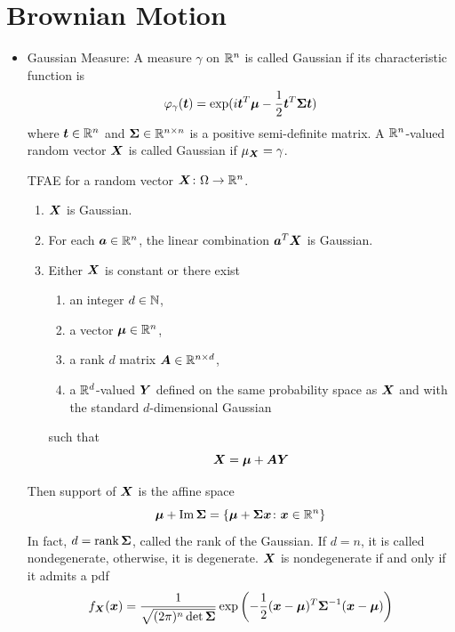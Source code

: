 \documentclass[a4paper,12pt]{article}
\begin{document}
\section{Brownian Motion}
\begin{itemize}
  \item Gaussian Measure: A measure $\gamma$ on $\mathbb{R}^n$ is called Gaussian if its characteristic function is
  \begin{equation*}
    \varphi_{\gamma}(\boldsymbol{t}) = \exp(i\boldsymbol{t}^T\boldsymbol{\mu}-\frac{1}{2}\boldsymbol{t}^T\boldsymbol{\Sigma}\boldsymbol{t})
  \end{equation*}
  where $\boldsymbol{t} \in \mathbb{R}^n$ and $\boldsymbol{\Sigma} \in \mathbb{R}^{n\times n}$ is a positive semi-definite matrix. A $\mathbb{R}^n$-valued random vector $\boldsymbol{X}$ is called Gaussian if $\mu_{\boldsymbol{X}} = \gamma$.

  \begin{thm}
    TFAE for a random vector $\boldsymbol{X} \colon \Omega \rightarrow \mathbb{R}^n$.
    \begin{enumerate}[label=(\arabic*)]
      \item $\boldsymbol{X}$ is Gaussian.
      \item For each $\boldsymbol{a} \in \mathbb{R}^n$, the linear combination $\boldsymbol{a}^T\boldsymbol{X}$ is Gaussian.
      \item Either $\boldsymbol{X}$ is constant or there exist
      \begin{enumerate}[label=(\roman*)]
        \item an integer $d \in \mathbb{N}$,
        \item a vector $\boldsymbol{\mu} \in \mathbb{R}^n$,
        \item a rank $d$ matrix $\boldsymbol{A} \in \mathbb{R}^{n \times d}$,
        \item a $\mathbb{R}^d$-valued $\boldsymbol{Y}$ defined on the same probability space as $\boldsymbol{X}$ and with the standard $d$-dimensional Gaussian
      \end{enumerate}
      such that
      \begin{equation*}
        \boldsymbol{X} = \boldsymbol{\mu} + \boldsymbol{A}\boldsymbol{Y}
      \end{equation*}
    \end{enumerate}
  \end{thm}
  \begin{rmk}
    Then support of $\boldsymbol{X}$ is the affine space
    \begin{equation*}
      \boldsymbol{\mu} + \operatorname{Im} \boldsymbol{\Sigma} = \left\{\boldsymbol{\mu} + \boldsymbol{\Sigma}\boldsymbol{x} \colon \boldsymbol{x} \in \mathbb{R}^n\right\}
    \end{equation*}
    In fact, $d = \operatorname{rank} \boldsymbol{\Sigma}$, called the rank of the Gaussian. If $d = n$, it is called nondegenerate, otherwise, it is degenerate. $\boldsymbol{X}$ is nondegenerate if and only if it admits a pdf
    \begin{equation*}
      f_{\boldsymbol{X}}(\boldsymbol{x})=\frac{1}{\sqrt{(2 \pi)^n \operatorname{det} \boldsymbol{\Sigma}}} \exp \left(-\frac{1}{2}(\boldsymbol{x}-\boldsymbol{\mu})^T \boldsymbol{\Sigma}^{-1}(\boldsymbol{x}-\boldsymbol{\mu})\right)
    \end{equation*}
  \end{rmk}


\end{itemize}
\end{document}
